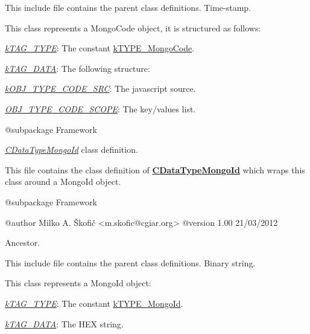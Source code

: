 This include file contains the parent class definitions. Time-\/stamp.

This class represents a Mongo\-Code object, it is structured as follows\-:


\begin{DoxyItemize}
\item {\itshape \hyperlink{}{k\-T\-A\-G\-\_\-\-T\-Y\-P\-E}}\-: The constant \hyperlink{}{k\-T\-Y\-P\-E\-\_\-\-Mongo\-Code}. 
\item {\itshape \hyperlink{}{k\-T\-A\-G\-\_\-\-D\-A\-T\-A}}\-: The following structure\-: 
\begin{DoxyItemize}
\item {\itshape \hyperlink{}{k\-O\-B\-J\-\_\-\-T\-Y\-P\-E\-\_\-\-C\-O\-D\-E\-\_\-\-S\-R\-C}}\-: The javascript source. 
\item {\itshape \hyperlink{}{O\-B\-J\-\_\-\-T\-Y\-P\-E\-\_\-\-C\-O\-D\-E\-\_\-\-S\-C\-O\-P\-E}}\-: The key/values list. 
\end{DoxyItemize}
\end{DoxyItemize}

\begin{DoxyVerb}    @subpackage     Framework\end{DoxyVerb}


{\itshape \hyperlink{class_c_data_type_mongo_id}{C\-Data\-Type\-Mongo\-Id}} class definition.

This file contains the class definition of {\bfseries \hyperlink{class_c_data_type_mongo_id}{C\-Data\-Type\-Mongo\-Id}} which wraps this class around a Mongo\-Id object.

\begin{DoxyVerb}    @subpackage     Framework

    @author         Milko A. Škofič <m.skofic@cgiar.org>
    @version        1.00 21/03/2012\end{DoxyVerb}


Ancestor.

This include file contains the parent class definitions. Binary string.

This class represents a Mongo\-Id object\-:


\begin{DoxyItemize}
\item {\itshape \hyperlink{}{k\-T\-A\-G\-\_\-\-T\-Y\-P\-E}}\-: The constant \hyperlink{}{k\-T\-Y\-P\-E\-\_\-\-Mongo\-Id}. 
\item {\itshape \hyperlink{}{k\-T\-A\-G\-\_\-\-D\-A\-T\-A}}\-: The H\-E\-X string. 
\end{DoxyItemize}

